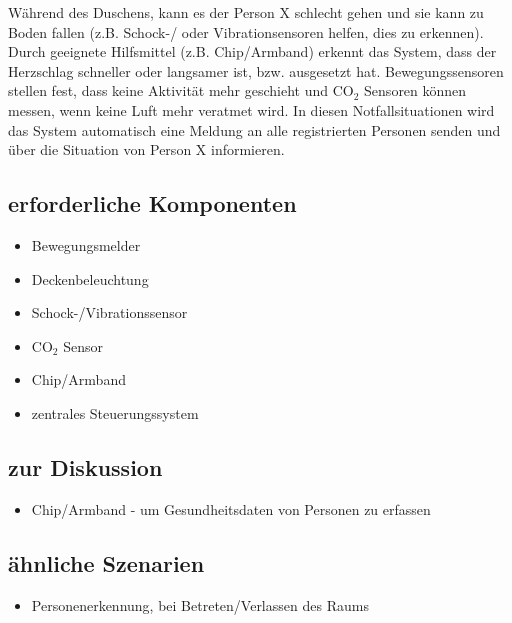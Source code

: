 Während des Duschens, kann es der Person X schlecht gehen und sie kann zu Boden fallen (z.B. Schock-/ oder Vibrationsensoren helfen, dies zu erkennen). Durch geeignete Hilfsmittel (z.B. Chip/Armband) erkennt das System, dass der Herzschlag schneller oder langsamer ist, bzw. ausgesetzt hat. Bewegungssensoren stellen fest, dass keine Aktivität mehr geschieht und CO$_2$ Sensoren können messen, wenn keine Luft mehr veratmet wird. In diesen Notfallsituationen wird das System automatisch eine Meldung an alle registrierten Personen senden und über die Situation von Person X informieren.

\subsection{erforderliche Komponenten}
\begin{itemize}
	\item Bewegungsmelder
	\item Deckenbeleuchtung
	\item Schock-/Vibrationssensor
	\item CO$_2$ Sensor
	\item Chip/Armband
	\item zentrales Steuerungssystem
\end{itemize}

\subsection{zur Diskussion}
\begin{itemize}
	\item Chip/Armband - um Gesundheitsdaten von Personen zu erfassen
\end{itemize}

\subsection{ähnliche Szenarien}
\begin{itemize}
	\item Personenerkennung, bei Betreten/Verlassen des Raums
\end{itemize}
